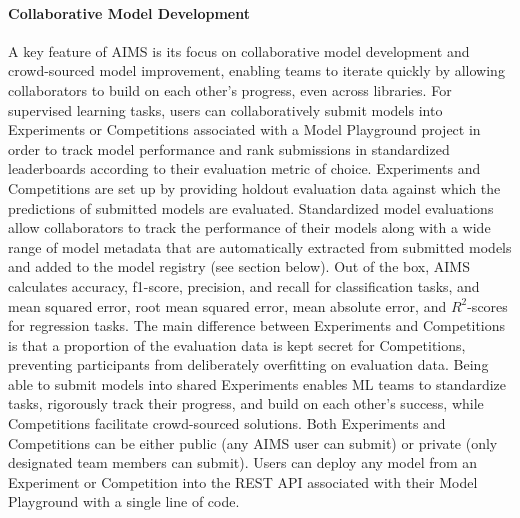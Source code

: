 \paragraph{Collaborative Model Development} A key feature of AIMS is its focus on collaborative model development and crowd-sourced model improvement, enabling teams to iterate quickly by allowing collaborators to build on each other's progress, even across libraries. For supervised learning tasks, users can collaboratively submit models into Experiments or Competitions associated with a Model Playground project in order to track model performance and rank submissions in standardized leaderboards according to their evaluation metric of choice. Experiments and Competitions are set up by providing holdout evaluation data against which the predictions of submitted models are evaluated. Standardized model evaluations allow collaborators to track the performance of their models along with a wide range of model metadata that are automatically extracted from submitted models and added to the model registry (see section below). Out of the box, AIMS calculates accuracy, f1-score, precision, and recall for classification tasks, and mean squared error, root mean squared error, mean absolute error, and $R^{2}$-scores for regression tasks. The main difference between Experiments and Competitions is that a proportion of the evaluation data is kept secret for Competitions, preventing participants from deliberately overfitting on evaluation data. Being able to submit models into shared Experiments enables ML teams to standardize tasks, rigorously track their progress, and build on each other's success, while Competitions facilitate crowd-sourced solutions. Both Experiments and Competitions can be either public (any AIMS user can submit) or private (only designated team members can submit). Users can deploy any model from an Experiment or Competition into the REST API associated with their Model Playground with a single line of code. 

